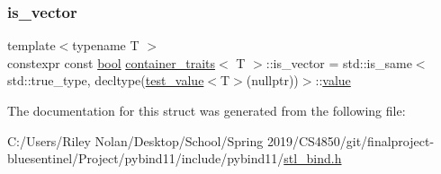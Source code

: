 \mbox{\label{structcontainer__traits_a766d4e152eb677e230229880dee2dbb2}} 
\subsubsection{\texorpdfstring{is\_vector}{is\_vector}}
{\footnotesize\ttfamily template$<$typename T $>$ \\
constexpr const \mbox{\hyperlink{asdl_8h_af6a258d8f3ee5206d682d799316314b1}{bool}} \mbox{\hyperlink{structcontainer__traits}{container\+\_\+traits}}$<$ T $>$\+::is\+\_\+vector = std\+::is\+\_\+same$<$std\+::true\+\_\+type, decltype(\mbox{\hyperlink{structcontainer__traits_a00e1d17df72634112a0d82724df08e97}{test\+\_\+value}}$<$T$>$(nullptr))$>$\+::\mbox{\hyperlink{_s_d_l__opengl__glext_8h_a8ad81492d410ff2ac11f754f4042150f}{value}}\hspace{0.3cm}{\ttfamily [static]}}



The documentation for this struct was generated from the following file\+:\begin{DoxyCompactItemize}
\item 
C\+:/\+Users/\+Riley Nolan/\+Desktop/\+School/\+Spring 2019/\+C\+S4850/git/finalproject-\/bluesentinel/\+Project/pybind11/include/pybind11/\mbox{\hyperlink{stl__bind_8h}{stl\+\_\+bind.\+h}}\end{DoxyCompactItemize}
